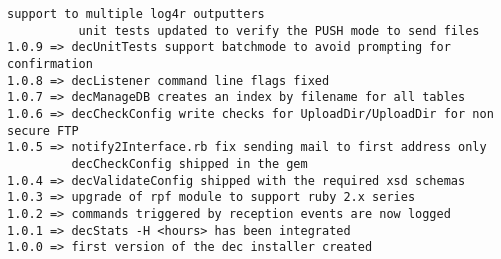 \documentclass[dec_sum_main.tex]{subfiles}
\begin{document}
\begin{Verbatim}[tabsize=4]
          support to multiple log4r outputters
          unit tests updated to verify the PUSH mode to send files
1.0.9 => decUnitTests support batchmode to avoid prompting for confirmation
1.0.8 => decListener command line flags fixed
1.0.7 => decManageDB creates an index by filename for all tables
1.0.6 => decCheckConfig write checks for UploadDir/UploadDir for non secure FTP
1.0.5 => notify2Interface.rb fix sending mail to first address only 
         decCheckConfig shipped in the gem
1.0.4 => decValidateConfig shipped with the required xsd schemas
1.0.3 => upgrade of rpf module to support ruby 2.x series
1.0.2 => commands triggered by reception events are now logged
1.0.1 => decStats -H <hours> has been integrated
1.0.0 => first version of the dec installer created
\end{Verbatim}
\end{document}
